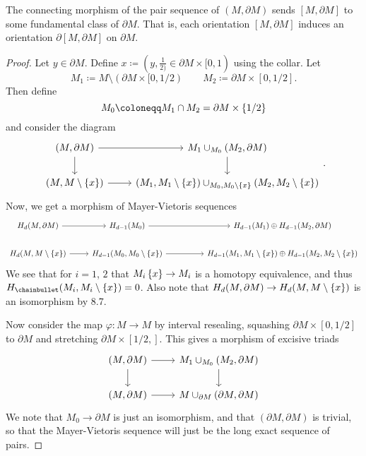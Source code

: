 \begin{lemma}
  The connecting morphism of the pair sequence of $(M, \partial M)$
  sends $[M, \partial M]$ to some fundamental class of $\partial M$.
  That is, each orientation $[M, \partial M]$ induces an orientation
  $\partial [M, \partial M]$ on $\partial M$.
\end{lemma}

\begin{proof}
  Let $y\in \partial M$.
  Define $x \coloneqq (y, \frac{1}{2)}\in \partial M \times [0,1)$
  using the collar.
  Let
  \[
    M_1 \coloneqq M \setminus (\partial M \times [0, 1/2)
    \qquad
    M_2 \coloneqq \partial M \times [0, 1/2]
  .\]
  Then define
  \[
    M_0 \coloneqq M_1 \cap M_2 = \partial M \times \set{ 1/2 } 
  \]
  and consider the diagram
  \[
    \begin{tikzcd}
      (M, \partial M)
      \ar[swap]{d}{}
      \ar{r}{}
      &
      M_1 \cup _{M_0} (M_2, \partial M)
      \ar{d}{}
      \\
      (M, M\setminus \set{ x } )
      \ar[swap]{r}{}
      &
      (M_1, M_1 \setminus \set{ x } ) \cup _{M_0, M_0 \setminus \set{ x } } (M_2, M_2 \setminus \set{ x } )
    \end{tikzcd}
  .\]
  Now, we get a morphism of Mayer-Vietoris sequences
  \[
    \begin{tikzcd}
      H_d(M, \partial M)
      \ar{r}
      &
      H_{d-1}(M_0)
      \ar{rr}{}
      &
      &
      H_{d-1}(M_1) \oplus H_{d-1}(M_2, \partial M)
      \\
      H_d(M, M \setminus \set{ x })
      \ar{r}
      &
      H_{d-1}(M_0, M_0\setminus \set{ x } )
      \ar{rr}{}
      &
      &
      H_{d-1}(M_1, M_1 \setminus \set{ x } )
      \oplus
      H_{d-1}(M_2, M_2 \setminus \set{ x } )
    \end{tikzcd}
  \]
  We see that for $i = 1$, $2$ that $M_i \\\left\{  x  \right\} \to M_i$
  is a homotopy equivalence, and thus
  $H_\chainbullet (M_i, M_i \setminus \set{ x })  = 0$.
  Also note that
  $H_d(M, \partial M) \to H_d(M, M\setminus \left\{  x  \right\} )$
  is an isomorphism by 8.7\todoref.

  Now consider the map $\varphi \colon M \to  M$
  by interval resealing, squashing $\partial M \times [0, 1/2]$
  to $\partial M$ and stretching $\partial M \times [1/2,]$.
  This gives a morphism of excisive triads
  \[
    \begin{tikzcd}
      (M, \partial M)
      \ar[swap]{d}{}
      \ar{r}{}
      &
      M_1 \cup _{M_0} (M_2, \partial M)
      \ar{d}{}
      \\
      (M, \partial M)
      \ar[swap]{r}{}
      &
      M \cup _{\partial M} (\partial M, \partial M)
    \end{tikzcd}
  \]
  We note that $M_0 \to \partial M$ is just an isomorphism,
  and that $(\partial M, \partial M)$ is trivial,
  so that the Mayer-Vietoris sequence will just be
  the long exact sequence of pairs.


\end{proof}
